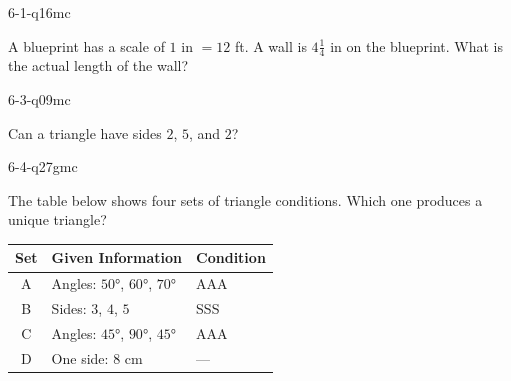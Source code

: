 \begin{practiceQuestion}{6-1-q16}{mc}
\begin{questionText}
A blueprint has a scale of $1$ in $= 12$ ft. A wall is $4\frac{1}{4}$ in on the blueprint. What is the actual length of the wall?
\end{questionText}
\end{practiceQuestion}

\begin{practiceQuestion}{6-3-q09}{mc}
\begin{questionText}
Can a triangle have sides $2$, $5$, and $2$?
\end{questionText}
\end{practiceQuestion}

\begin{practiceQuestion}{6-4-q27}{gmc}
\begin{questionText}
The table below shows four sets of triangle conditions. Which one produces a unique triangle?

\begin{center}
\begin{tabular}{|c|l|l|}
\hline
\textbf{Set} & \textbf{Given Information} & \textbf{Condition} \\
\hline
A & Angles: $50°$, $60°$, $70°$ & AAA \\
\hline
B & Sides: $3$, $4$, $5$ & SSS \\
\hline
C & Angles: $45°$, $90°$, $45°$ & AAA \\
\hline
D & One side: $8$ cm & --- \\
\hline
\end{tabular}
\end{center}
\end{questionText}
\end{practiceQuestion}

